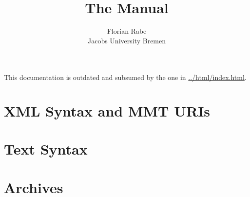 \documentclass{article}
\title{The {\mmt} Manual}
\author{Florian Rabe \\
Jacobs University Bremen}
\begin{document}
\maketitle

\begin{center}
This documentation is outdated and subsumed by the one in \url{../html/index.html}.
\end{center}

\section{XML Syntax and MMT URIs}\label{sec:syntax}
  

%  

\section{Text Syntax}\label{sec:syntax}
  

\section{Archives}\label{sec:archives}
  



\end{document}
